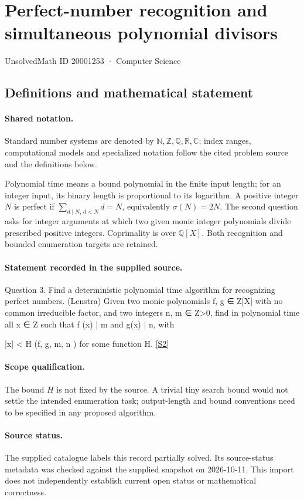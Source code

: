 \documentclass[11pt]{article}
\newcommand{\sref}[2]{\hyperlink{source:#1:#2}{[S#2]}}
\begin{document}
\setcounter{section}{20001252}
\section{Perfect-number recognition and simultaneous polynomial divisors}\label{20001253}
{\small\sffamily UnsolvedMath ID 20001253 · Computer Science}
\subsection{Definitions and mathematical statement}

\paragraph{Shared notation.}Standard number systems are denoted by $\mathbb N,\mathbb Z,\mathbb Q,\mathbb R,\mathbb C$; index ranges, computational models and specialized notation follow the cited problem source and the definitions below.


Polynomial time means a bound polynomial in the finite input length; for an integer input, its binary length is proportional to its logarithm. A positive integer $N$ is perfect if $\sum_{d\mid N,\,d<N}d=N$, equivalently $\sigma(N)=2N$. The second question asks for integer arguments at which two given monic integer polynomials divide prescribed positive integers. Coprimality is over $\mathbb Q[X]$. Both recognition and bounded enumeration targets are retained.
\paragraph{Statement recorded in the supplied source.}
Question 3. Find a deterministic polynomial time algorithm for recognizing perfect numbers. (Lenstra) Given two monic polynomials f, g ∈ Z[X] with no common irreducible factor, and two integers n, m ∈ Z>0, find in polynomial time all x ∈ Z such that f (x) | m and g(x) | n, with

|x| < H (f, g, m, n ) for some function H. \sref{20001253}{2}
\paragraph{Scope qualification.}
The bound $H$ is not fixed by the source. A trivial tiny search bound would not settle the intended enumeration task; output-length and bound conventions need to be specified in any proposed algorithm.
\paragraph{Source status.}
The supplied catalogue labels this record partially solved. Its source-status metadata was checked against the supplied snapshot on 2026-10-11. This import does not independently establish current open status or mathematical correctness.
\end{document}
